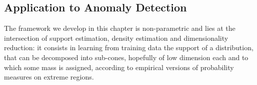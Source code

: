 \subsection{Application to Anomaly Detection}
The framework we develop in this chapter is non-parametric and lies at
the intersection of support estimation, density estimation and
dimensionality reduction: it consists in learning from training data
the support of a distribution, that can be decomposed into sub-cones,
hopefully of low dimension each and to which some mass is assigned,
according to %
empirical versions of probability measures on %
extreme regions. 

